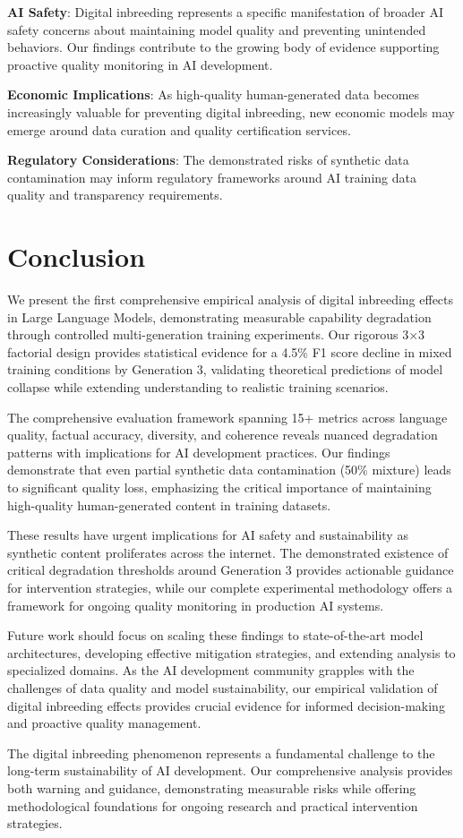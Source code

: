 \documentclass{article}
\begin{document}
\textbf{AI Safety}: Digital inbreeding represents a specific manifestation of broader AI safety concerns about maintaining model quality and preventing unintended behaviors. Our findings contribute to the growing body of evidence supporting proactive quality monitoring in AI development.

\textbf{Economic Implications}: As high-quality human-generated data becomes increasingly valuable for preventing digital inbreeding, new economic models may emerge around data curation and quality certification services.

\textbf{Regulatory Considerations}: The demonstrated risks of synthetic data contamination may inform regulatory frameworks around AI training data quality and transparency requirements.

\section{Conclusion}

We present the first comprehensive empirical analysis of digital inbreeding effects in Large Language Models, demonstrating measurable capability degradation through controlled multi-generation training experiments. Our rigorous 3×3 factorial design provides statistical evidence for a 4.5\% F1 score decline in mixed training conditions by Generation 3, validating theoretical predictions of model collapse while extending understanding to realistic training scenarios.

The comprehensive evaluation framework spanning 15+ metrics across language quality, factual accuracy, diversity, and coherence reveals nuanced degradation patterns with implications for AI development practices. Our findings demonstrate that even partial synthetic data contamination (50\% mixture) leads to significant quality loss, emphasizing the critical importance of maintaining high-quality human-generated content in training datasets.

These results have urgent implications for AI safety and sustainability as synthetic content proliferates across the internet. The demonstrated existence of critical degradation thresholds around Generation 3 provides actionable guidance for intervention strategies, while our complete experimental methodology offers a framework for ongoing quality monitoring in production AI systems.

Future work should focus on scaling these findings to state-of-the-art model architectures, developing effective mitigation strategies, and extending analysis to specialized domains. As the AI development community grapples with the challenges of data quality and model sustainability, our empirical validation of digital inbreeding effects provides crucial evidence for informed decision-making and proactive quality management.

The digital inbreeding phenomenon represents a fundamental challenge to the long-term sustainability of AI development. Our comprehensive analysis provides both warning and guidance, demonstrating measurable risks while offering methodological foundations for ongoing research and practical intervention strategies.



\end{document}

